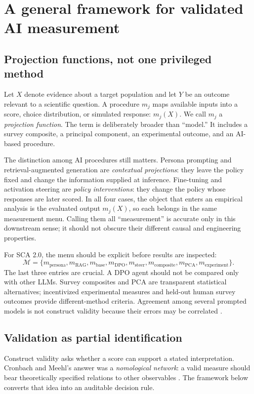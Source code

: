 \documentclass[10pt,letterpaper]{article}
\newcommand{\M}{\mathcal{M}}
\begin{document}
\clearpage
\section{A general framework for validated AI measurement}
\subsection{Projection functions, not one privileged method}
Let $X$ denote evidence about a target population and let $Y$ be an outcome relevant to a scientific question. A procedure $m_j$ maps available inputs into a score, choice distribution, or simulated response: $m_j(X)$. We call $m_j$ a \emph{projection function}. The term is deliberately broader than ``model.'' It includes a survey composite, a principal component, an experimental outcome, and an AI-based procedure.

The distinction among AI procedures still matters. Persona prompting and retrieval-augmented generation are \emph{contextual projections}: they leave the policy fixed and change the information supplied at inference. Fine-tuning and activation steering are \emph{policy interventions}: they change the policy whose responses are later scored. In all four cases, the object that enters an empirical analysis is the evaluated output $m_j(X)$, so each belongs in the same measurement menu. Calling them all ``measurement'' is accurate only in this downstream sense; it should not obscure their different causal and engineering properties.

For SCA 2.0, the menu should be explicit before results are inspected:
\[
\M=\{m_{\mathrm{persona}},m_{\mathrm{RAG}},m_{\mathrm{base}},m_{\mathrm{DPO}},m_{\mathrm{steer}},m_{\mathrm{composite}},m_{\mathrm{PCA}},m_{\mathrm{experiment}}\}.
\]
The last three entries are crucial. A DPO agent should not be compared only with other LLMs. Survey composites and PCA are transparent statistical alternatives; incentivized experimental measures and held-out human survey outcomes provide different-method criteria. Agreement among several prompted models is not construct validity because their errors may be correlated \cite{campbell1959,ludwig2026}.

\subsection{Validation as partial identification}
Construct validity asks whether a score can support a stated interpretation. Cronbach and Meehl's answer was a \emph{nomological network}: a valid measure should bear theoretically specified relations to other observables \cite{cronbach1955}. The framework below converts that idea into an auditable decision rule.
\end{document}
